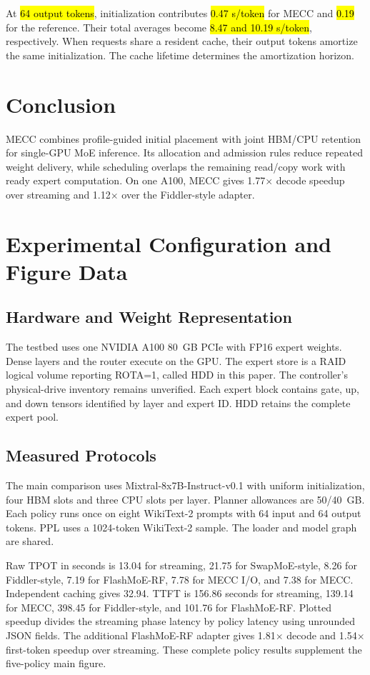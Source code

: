 \documentclass[conference,9pt,letterpaper]{IEEEtran}
\DeclareRobustCommand{\pending}[1]{{\sethlcolor{yellow}\hl{#1}}}
\begin{document}
At \pending{64 output tokens}, initialization contributes \pending{0.47 s/token} for MECC and \pending{0.19} for the reference. Their total averages become \pending{8.47 and 10.19 s/token}, respectively. When requests share a resident cache, their output tokens amortize the same initialization. The cache lifetime determines the amortization horizon.

\section{Conclusion}
MECC combines profile-guided initial placement with joint HBM/CPU retention for single-GPU MoE inference. Its allocation and admission rules reduce repeated weight delivery, while scheduling overlaps the remaining read/copy work with ready expert computation. On one A100, MECC gives 1.77$\times$ decode speedup over streaming and 1.12$\times$ over the Fiddler-style adapter.

\clearpage
\balance


\clearpage
\appendices
\balance
\section{Experimental Configuration and Figure Data}
\label{app:setup}
\subsection{Hardware and Weight Representation}
The testbed uses one NVIDIA A100 80~GB PCIe with FP16 expert weights. Dense layers and the router execute on the GPU. The expert store is a RAID logical volume reporting ROTA=1, called HDD in this paper. The controller's physical-drive inventory remains unverified. Each expert block contains gate, up, and down tensors identified by layer and expert ID. HDD retains the complete expert pool.

\subsection{Measured Protocols}
The main comparison uses Mixtral-8x7B-Instruct-v0.1 with uniform initialization, four HBM slots and three CPU slots per layer. Planner allowances are 50/40~GB. Each policy runs once on eight WikiText-2 prompts with 64 input and 64 output tokens. PPL uses a 1024-token WikiText-2 sample. The loader and model graph are shared.

Raw TPOT in seconds is 13.04 for streaming, 21.75 for SwapMoE-style, 8.26 for Fiddler-style, 7.19 for FlashMoE-RF, 7.78 for MECC I/O, and 7.38 for MECC. Independent caching gives 32.94. TTFT is 156.86 seconds for streaming, 139.14 for MECC, 398.45 for Fiddler-style, and 101.76 for FlashMoE-RF. Plotted speedup divides the streaming phase latency by policy latency using unrounded JSON fields. The additional FlashMoE-RF adapter gives 1.81$\times$ decode and 1.54$\times$ first-token speedup over streaming. These complete policy results supplement the five-policy main figure.
\end{document}
